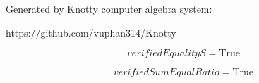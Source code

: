 \documentclass[letterpaper, 10pt]{extarticle}
\begin{document}
Generated by Knotty computer algebra system:

https://github.com/vuphan314/Knotty

\hrulefill

\bigskip

\begin{dmath*}
verifiedEqualityS =
    \mathrm{True}
\end{dmath*}


\begin{dmath*}
verifiedSumEqualRatio =
    \mathrm{True}
\end{dmath*}
\end{document}
